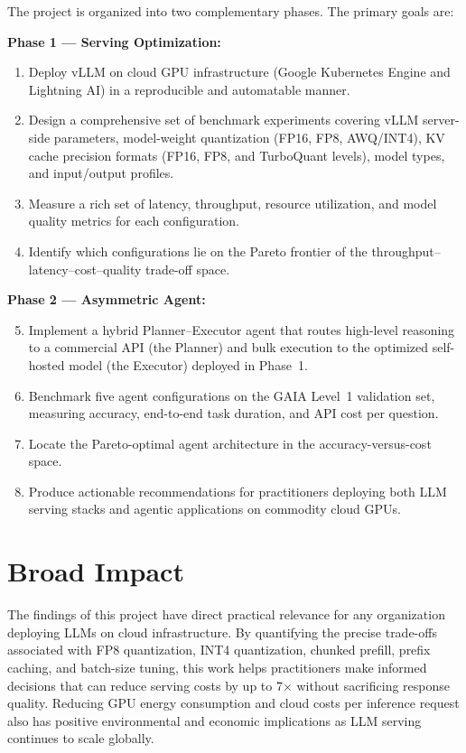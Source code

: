 \documentclass[a4paper,12pt]{report}
\begin{document}
The project is organized into two complementary phases. The primary goals are:

\textbf{Phase 1 --- Serving Optimization:}
\begin{enumerate}
    \item Deploy vLLM on cloud GPU infrastructure (Google Kubernetes Engine and Lightning AI) in a reproducible and automatable manner.
    \item Design a comprehensive set of benchmark experiments covering vLLM server-side parameters, model-weight quantization (FP16, FP8, AWQ/INT4), KV cache precision formats (FP16, FP8, and TurboQuant levels), model types, and input/output profiles.
    \item Measure a rich set of latency, throughput, resource utilization, and model quality metrics for each configuration.
    \item Identify which configurations lie on the Pareto frontier of the throughput--latency--cost--quality trade-off space.
\end{enumerate}

\textbf{Phase 2 --- Asymmetric Agent:}
\begin{enumerate}
    \setcounter{enumi}{4}
    \item Implement a hybrid Planner--Executor agent that routes high-level reasoning to a commercial API (the Planner) and bulk execution to the optimized self-hosted model (the Executor) deployed in Phase~1.
    \item Benchmark five agent configurations on the GAIA Level~1 validation set, measuring accuracy, end-to-end task duration, and API cost per question.
    \item Locate the Pareto-optimal agent architecture in the accuracy-versus-cost space.
    \item Produce actionable recommendations for practitioners deploying both LLM serving stacks and agentic applications on commodity cloud GPUs.
\end{enumerate}

\section{Broad Impact}

The findings of this project have direct practical relevance for any organization deploying LLMs on cloud infrastructure. By quantifying the precise trade-offs associated with FP8 quantization, INT4 quantization, chunked prefill, prefix caching, and batch-size tuning, this work helps practitioners make informed decisions that can reduce serving costs by up to 7$\times$ without sacrificing response quality. Reducing GPU energy consumption and cloud costs per inference request also has positive environmental and economic implications as LLM serving continues to scale globally.
\end{document}
